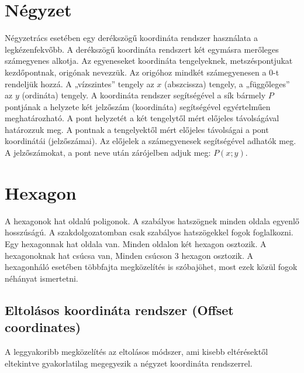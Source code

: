 
\section{Négyzet}

Négyzetrács esetében egy derékszögű koordináta rendszer használata a legkézenfekvőbb. 
\newline
\newline A derékszögű koordináta rendszert két egymásra merőleges számegyenes alkotja. Az egyeneseket koordináta tengelyeknek, metszéspontjukat kezdőpontnak, origónak nevezzük. Az origóhoz mindkét számegyenesen a $0$-t rendeljük hozzá. A „vízszintes” tengely az $x$ (abszcissza) tengely, a „függőleges” az $y$ (ordináta) tengely.
\newline
\newline A koordináta rendszer segítségével a sík bármely $P$ pontjának a helyzete két jelzőszám (koordináta) segítségével egyértelműen meghatározható. A pont helyzetét a két tengelytől mért előjeles távolságával határozzuk meg. A pontnak a tengelyektől mért előjeles távolságai a pont koordinátái (jelzőszámai). Az előjelek a számegyenesek segítségével adhatók meg. A jelzőszámokat, a pont neve után zárójelben adjuk meg: $P(x;y)$.

\section{Hexagon}

A hexagonok hat oldalú poligonok. A szabályos hatszögnek minden oldala egyenlő hosszúságú. A szakdolgozatomban csak szabályos hatszögekkel fogok foglalkozni. 
\newline
\newline Egy hexagonnak hat oldala van. Minden oldalon két hexagon osztozik. A hexagonoknak hat csúcsa van, Minden csúcson 3 hexagon osztozik.
\newline
\newline A hexagonháló esetében többfajta megközelítés is szóbajöhet, most ezek közül fogok néhányat ismertetni. 

\subsection{Eltolásos koordináta rendszer (Offset coordinates)}

A leggyakoribb megközelítés az eltolásos módszer, ami kisebb eltérésektől eltekintve gyakorlatilag megegyezik a négyzet koordináta rendszerrel. 
\newline
\newline\newline

